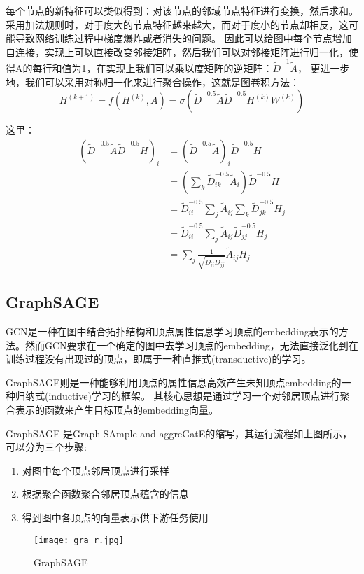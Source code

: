 \documentclass[a4paper,AutoFakeBold,AutoFakeSlant]{ctexart}
\begin{document}
每个节点的新特征可以类似得到：对该节点的邻域节点特征进行变换，然后求和。采用加法规则时，对于度大的节点特征越来越大，而对于度小的节点却相反，这可能导致网络训练过程中梯度爆炸或者消失的问题。
因此可以给图中每个节点增加自连接，实现上可以直接改变邻接矩阵，然后我们可以对邻接矩阵进行归一化，使得A的每行和值为1，在实现上我们可以乘以度矩阵的逆矩阵：$\tilde{D}^{-1} \tilde{A}$，
更进一步地，我们可以采用对称归一化来进行聚合操作，这就是图卷积方法：
\begin{equation}
  H^{(k+1)}=f\left(H^{(k)}, A\right)=\sigma\left(\tilde{D}^{-0.5} \tilde{A} \tilde{D}^{-0.5} H^{(k)} W^{(k)}\right)
\end{equation}

这里：
\begin{equation}
  \begin{aligned}
    \left(\tilde{D}^{-0.5} \tilde{A} \tilde{D}^{-0.5} H\right)_{i} &=\left(\tilde{D}^{-0.5} \tilde{A}\right)_{i} \tilde{D}^{-0.5} H \\
    &=\left(\sum_{k} \tilde{D}_{i k}^{-0.5} \tilde{A}_{i}\right) \tilde{D}^{-0.5} H \\
    &=\tilde{D}_{i i}^{-0.5} \sum_{j} \tilde{A}_{i j} \sum_{k} \tilde{D}_{j k}^{-0.5} H_{j} \\
    &=\tilde{D}_{i i}^{-0.5} \sum_{j} \tilde{A}_{i j} \tilde{D}_{j j}^{-0.5} H_{j} \\
    &=\sum_{j} \frac{1}{\sqrt{\tilde{D}_{i i} \tilde{D}_{j j}}} \tilde{A}_{i j} H_{j}
    \end{aligned}
\end{equation}

\subsection{GraphSAGE}
GCN是一种在图中结合拓扑结构和顶点属性信息学习顶点的embedding表示的方法。然而GCN要求在一个确定的图中去学习顶点的embedding，无法直接泛化到在训练过程没有出现过的顶点，即属于一种直推式(transductive)的学习。

GraphSAGE则是一种能够利用顶点的属性信息高效产生未知顶点embedding的一种归纳式(inductive)学习的框架。
其核心思想是通过学习一个对邻居顶点进行聚合表示的函数来产生目标顶点的embedding向量。

GraphSAGE 是Graph SAmple and aggreGatE的缩写，其运行流程如上图所示，可以分为三个步骤:
\begin{enumerate}
  \item 对图中每个顶点邻居顶点进行采样 
  \item 根据聚合函数聚合邻居顶点蕴含的信息 
  \item 得到图中各顶点的向量表示供下游任务使用
\end{enumerate}
\begin{figure}[htbp]
  \centering
  \texttt{[image: gra\_r.jpg]}
  \caption{GraphSAGE}
\end{figure}
\end{document}
